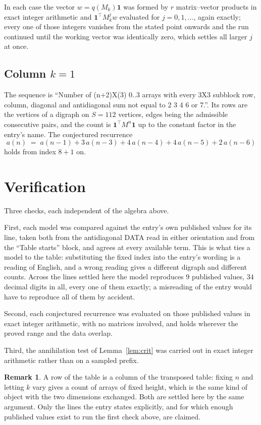 \documentclass[11pt,a4paper]{article}
\theoremstyle{plain}
\theoremstyle{definition}
\newtheorem{remark}[theorem]{Remark}
\begin{document}
In each case the vector $w=q(M_k)\mathbf{1}$ was formed by $r$ matrix--vector products in
exact integer arithmetic and $\mathbf{1}^{\!\top}M_k^{j}w$ evaluated for $j=0,1,\dots$,
again exactly; every one of those integers vanishes from the stated point onwards and the run
continued until the working vector was identically zero, which settles all larger $j$ at once.

\subsection*{Column $k$$=1$}
The sequence is ``Number of (n+2)X(3) 0..3 arrays with every 3X3 subblock row, column, diagonal and antidiagonal sum not equal to 2 3 4 6 or 7.''. Its rows are the vertices of a digraph on
$S=112$ vertices, edges being the admissible consecutive pairs, and the count is
$\mathbf{1}^{\!\top}M^{n}\mathbf{1}$ up to the constant factor in the entry's name.
The conjectured recurrence
\[
a(n)\;=\;a(n-1) + 3\,a(n-3) + 4\,a(n-4) + 4\,a(n-5) + 2\,a(n-6)
\]
holds from index $8+1$ on.

\section{Verification}

Three checks, each independent of the algebra above.

First, each model was compared against the entry's own published values for its line, taken
both from the antidiagonal DATA read in either orientation and from the ``Table starts''
block, and agrees at every available term. This is what ties a model to the table:
substituting the fixed index into the entry's wording is a reading of English, and a wrong
reading gives a different digraph and different counts. Across the lines settled here the
model reproduces $9$ published values, $34$ decimal digits in all, every one of
them exactly; a misreading of the entry would have to reproduce all of them by accident.

Second, each conjectured recurrence was evaluated on those published values in exact
integer arithmetic, with no matrices involved, and holds wherever the proved range and the
data overlap.

Third, the annihilation test of Lemma~\ref{lem:crit} was carried out in exact integer
arithmetic rather than on a sampled prefix.

\begin{remark}
A row of the table is a column of the transposed table: fixing $n$ and letting $k$ vary gives a
count of arrays of fixed height, which is the same kind of object with the two dimensions
exchanged. Both are settled here by the same argument. Only the lines the entry states
explicitly, and for which enough published values exist to run the first check above, are
claimed.
\end{remark}
\end{document}

